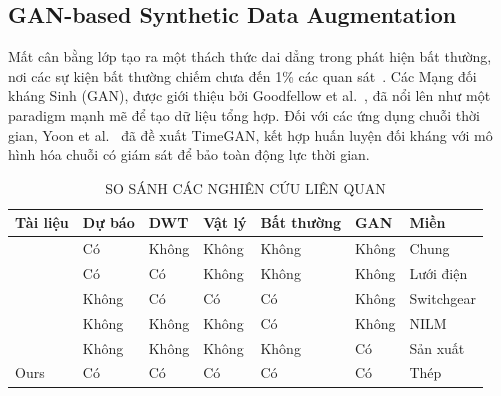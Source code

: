 \subsection{GAN-based Synthetic Data Augmentation}

Mất cân bằng lớp tạo ra một thách thức dai dẳng trong phát hiện bất thường, nơi các sự kiện bất thường chiếm chưa đến 1\% các quan sát~\cite{chandola2009}. Các Mạng đối kháng Sinh (GAN), được giới thiệu bởi Goodfellow et al.~\cite{goodfellow2014}, đã nổi lên như một paradigm mạnh mẽ để tạo dữ liệu tổng hợp. Đối với các ứng dụng chuỗi thời gian, Yoon et al.~\cite{yoon2019} đã đề xuất TimeGAN, kết hợp huấn luyện đối kháng với mô hình hóa chuỗi có giám sát để bảo toàn động lực thời gian.

\begin{table}[htbp]
\caption{SO SÁNH CÁC NGHIÊN CỨU LIÊN QUAN}
\label{tab:related}
\centering
\small
\begin{tabular}{@{}p{2.2cm}p{2.0cm}p{1.0cm}p{1.1cm}p{1.5cm}p{1.0cm}p{2.2cm}@{}}
\toprule
Tài liệu & Dự báo & DWT & Vật lý & Bất thường & GAN & Miền \\
\midrule
\cite{hippert2001} & Có & Không & Không & Không & Không & Chung \\
\cite{zhang2024} & Có & Có & Không & Không & Không & Lưới điện \\
\cite{hoffmann2020switchgear} & Không & Có & Có & Có & Không & Switchgear \\
\cite{rashid2019nilm} & Không & Không & Không & Có & Không & NILM \\
\cite{tang2025} & Không & Không & Không & Không & Có & Sản xuất \\
Ours & Có & Có & Có & Có & Có & Thép \\
\bottomrule
\end{tabular}
\end{table}


